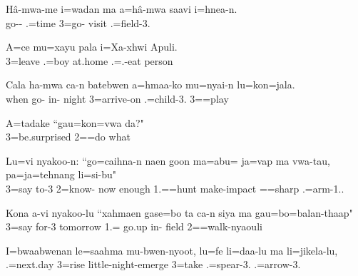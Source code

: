 \ea
\gll Hâ-mwa-me i=wadan ma a=hâ-mwa saavi i=hnea-n.\\ go-- .=time  3=go- visit .=field-3.\\ \glt {}
\z 

\ea
\gll A=ce mu=xayu pala i=Xa-xhwi Apuli.\\ 3=leave .=boy at.home .=.-eat person\\ \glt {} 
\z 

\ea
\gll Cala ha-mwa ca-n batebwen a=hmaa-ko mu=nyai-n lu=kon=jala.\\ when go- in- night 3=arrive-on .=child-3. 3==play\\ \glt  {}
\z

\ea
\gll A=tadake ``gau=kon=vwa da?"\\ 3=be.surprised 2==do what\\ \glt  {}
\z

\ea
\gll Lu=vi nyakoo-n: ``go=caihna-n naen goon ma=abu= ja=vap ma vwa-tau, pa=ja=tehnang li=si-bu"\\ 3=say to-3 2=know- now enough  1.==hunt  make-impact ==sharp .=arm-1..\\ \glt {}
\z 

\ea
\gll Kona a-vi nyakoo-lu ``xahmaen gase=bo ta ca-n siya ma gau=bo=balan-thaap"\\  3=say for-3 tomorrow 1.= go.up in- field  2==walk-nyaouli\\ \glt {}
\z

\ea
\gll I=bwaabwenan le=saahma mu-bwen-nyoot, lu=fe li=daa-lu ma li=jikela-lu,\\ 
    .=next.day 3=rise little-night-emerge 3=take .=spear-3.  .=arrow-3.\\ 
    \glt  {}
\z

